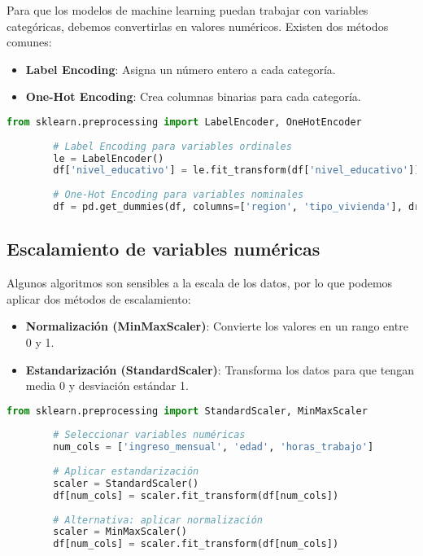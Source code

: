 \documentclass{book}
\begin{document}
	Para que los modelos de machine learning puedan trabajar con variables categóricas, debemos convertirlas en valores numéricos. Existen dos métodos comunes:
	
	\begin{itemize}
		\item \textbf{Label Encoding}: Asigna un número entero a cada categoría.
		\item \textbf{One-Hot Encoding}: Crea columnas binarias para cada categoría.
	\end{itemize}
	
	\begin{lstlisting}[language=Python, caption=Codificación de variables categóricas]
		from sklearn.preprocessing import LabelEncoder, OneHotEncoder
		
		# Label Encoding para variables ordinales
		le = LabelEncoder()
		df['nivel_educativo'] = le.fit_transform(df['nivel_educativo'])
		
		# One-Hot Encoding para variables nominales
		df = pd.get_dummies(df, columns=['region', 'tipo_vivienda'], drop_first=True)
	\end{lstlisting}
	
	\subsection{Escalamiento de variables numéricas}
	
	Algunos algoritmos son sensibles a la escala de los datos, por lo que podemos aplicar dos métodos de escalamiento:
	
	\begin{itemize}
		\item \textbf{Normalización (MinMaxScaler)}: Convierte los valores en un rango entre 0 y 1.
		\item \textbf{Estandarización (StandardScaler)}: Transforma los datos para que tengan media 0 y desviación estándar 1.
	\end{itemize}
	
	\begin{lstlisting}[language=Python, caption=Escalamiento de variables numéricas]
		from sklearn.preprocessing import StandardScaler, MinMaxScaler
		
		# Seleccionar variables numéricas
		num_cols = ['ingreso_mensual', 'edad', 'horas_trabajo']
		
		# Aplicar estandarización
		scaler = StandardScaler()
		df[num_cols] = scaler.fit_transform(df[num_cols])
		
		# Alternativa: aplicar normalización
		scaler = MinMaxScaler()
		df[num_cols] = scaler.fit_transform(df[num_cols])
	\end{lstlisting}
	
\end{document}
